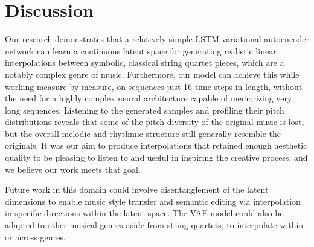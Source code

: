 \documentclass[sigconf,authorversion]{acmart}
\begin{document}
\section{Discussion}

Our research demonstrates that a relatively simple LSTM variational
autoencoder network can learn a continuous latent space for generating
realistic linear interpolations between symbolic, classical string
quartet pieces, which are a notably complex genre of music.
Furthermore, our model can achieve this while working
measure-by-measure, on sequences just 16 time steps in length, without
the need for a highly complex neural architecture capable of
memorizing very long sequences. Listening to the generated samples and
profiling their pitch distributions reveals that some of the pitch
diversity of the original music is lost, but the overall melodic and
rhythmic structure still generally resemble the originals. It was our
aim to produce interpolations that retained enough aesthetic quality
to be pleasing to listen to and useful in inspiring the creative
process, and we believe our work meets that goal.

Future work in this domain could involve disentanglement of the latent
dimensions to enable music style transfer and semantic editing via
interpolation in specific directions within the latent space. The VAE
model could also be adapted to other musical genres aside from string
quartets, to interpolate within or across genres.



\end{document}
